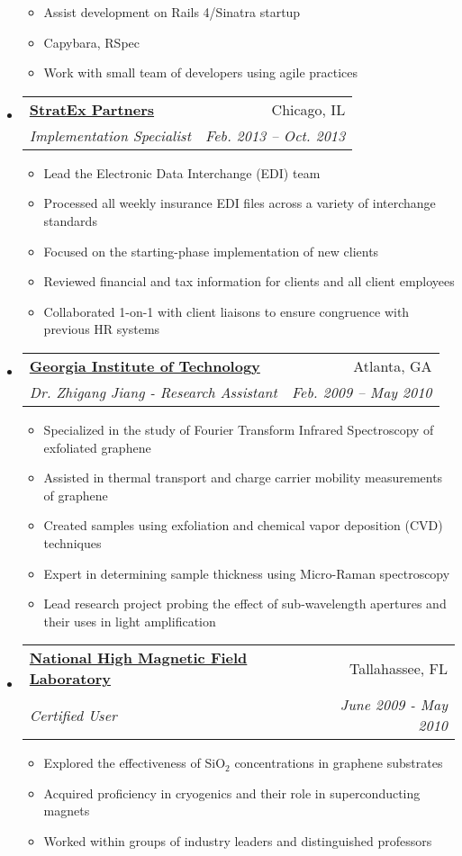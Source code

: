 \documentclass[letterpaper,11pt]{article}
\makeatletter
\newcommand{\resitem}[1]{\item #1 \vspace{-2pt}}
\newcommand{\ressubheading}[4]{
\begin{tabular*}{6.5in}{l@{\extracolsep{\fill}}r}
		\textbf{#1} & #2 \\
		\textit{#3} & \textit{#4} \\
\end{tabular*}\vspace{-6pt}}
\makeatother
\begin{document}
\begin{itemize}
    { \footnotesize
    \begin{itemize}
        \resitem{Assist development on Rails 4/Sinatra startup}
        \resitem{Capybara, RSpec}
        \resitem{Work with small team of developers using agile practices}
    \end{itemize}
    }
\item
  \ressubheading{\href{http://www.stratexpartners.com/}{StratEx Partners}}{Chicago, IL}{Implementation Specialist}{Feb. 2013 -- Oct. 2013}
    { \footnotesize
    \begin{itemize}
        \resitem{Lead the Electronic Data Interchange (EDI) team}
        \resitem{Processed all weekly insurance EDI files across a variety of interchange standards}
        \resitem{Focused on the starting-phase implementation of new clients}
        \resitem{Reviewed financial and tax information for clients and all client employees}
        \resitem{Collaborated 1-on-1 with client liaisons to ensure congruence with previous HR systems}
    \end{itemize}
    }

  \item
    \ressubheading{\href{http://phweb.physics.gatech.edu/research/jiang/members.html}{Georgia Institute of Technology}}{Atlanta, GA}{Dr. Zhigang Jiang - Research Assistant}{Feb. 2009 -- May 2010}
    { \footnotesize
    \begin{itemize}
        \resitem{Specialized in the study of Fourier Transform Infrared Spectroscopy of exfoliated graphene}
        \resitem{Assisted in thermal transport and charge carrier mobility measurements of graphene}
        \resitem{Created samples using exfoliation and chemical vapor deposition (CVD) techniques}
        \resitem{Expert in determining sample thickness using Micro-Raman spectroscopy}
        \resitem{Lead research project probing the effect of sub-wavelength apertures and their uses in light amplification}
    \end{itemize}
    }
  \item
    \ressubheading{\href{http://www.magnet.fsu.edu/}{National High Magnetic Field Laboratory}}{Tallahassee, FL}{Certified User}{June 2009 - May 2010}
    { \footnotesize
    \begin{itemize}
        \resitem{Explored the effectiveness of SiO$_{2}$ concentrations in graphene substrates}
        \resitem{Acquired proficiency in cryogenics and their role in superconducting magnets}
        \resitem{Worked within groups of industry leaders and distinguished professors}
    \end{itemize}
    }
\end{itemize}
\end{document}
